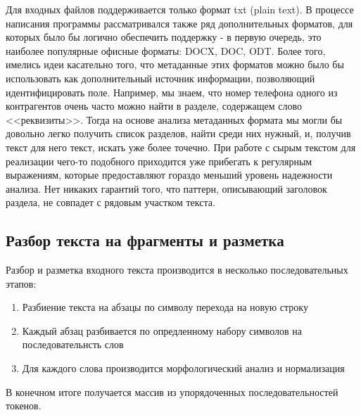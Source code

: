 Для входных файлов поддерживается только формат txt (plain text). В процессе написания программы рассматривался также ряд дополнительных форматов, для которых было бы логично обеспечить поддержку - в первую очередь, это наиболее популярные офисные форматы: DOCX, DOC, ODT. Более того, имелись идеи касательно того, что метаданные этих форматов можно было бы использовать как дополнительный источник информации, позволяющий идентифицировать поле. Например, мы знаем, что номер телефона одного из контрагентов очень часто можно найти в разделе, содержащем слово <<реквизиты>>. Тогда на основе анализа метаданных формата мы могли бы довольно легко получить список разделов, найти среди них нужный, и, получив текст для него текст, искать уже более точечно. При работе с сырым текстом для реализации чего-то подобного приходится уже прибегать к регулярным выражениям, которые предоставляют гораздо меньший уровень надежности анализа. Нет никаких гарантий того, что паттерн, описывающий заголовок раздела, не совпадет с рядовым участком текста.

\subsection{Разбор текста на фрагменты и разметка}
Разбор и разметка входного текста производится в несколько последовательных этапов:
\begin{enumerate}
  \item Разбиение текста на абзацы по символу перехода на новую строку
  \item Каждый абзац разбивается по опредленному набору символов на последовательнсть слов
  \item Для каждого слова производится морфологический анализ и нормализация
\end{enumerate}
В конечном итоге получается массив из упорядоченных последовательностей токенов.

